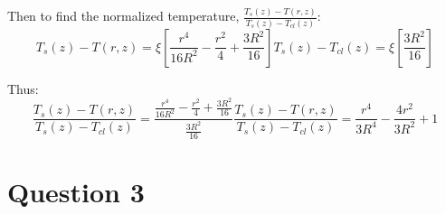 \documentclass{article}
\begin{document}
Then to find the normalized temperature, $\frac{T_s(z) - T(r,z)}{T_s(z) - T_{cl}(z)}$:
\begin{subequations}
    \begin{equation}
        T_s(z) - T(r,z) = \xi\left[ \frac{r^4}{16R^2} - \frac{r^2}{4} + \frac{3R^2}{16} \right]
    \end{equation}
    \begin{equation}
        T_s(z) - T_{cl}(z) = \xi [\frac{3R^2}{16}]
    \end{equation}
\end{subequations}

Thus:
\begin{subequations}

    \begin{equation}
        \frac{T_s(z) - T(r,z)}{T_s(z) - T_{cl}(z)} = \frac{\frac{r^4}{16R^2} - \frac{r^2}{4} + \frac{3R^2}{16}}{\frac{3R^2}{16}}
    \end{equation}
    \begin{equation}
        \frac{T_s(z) - T(r,z)}{T_s(z) - T_{cl}(z)} = \frac{r^4}{3R^4} - \frac{4r^2}{3R^2} + 1 
    \end{equation}
\end{subequations}
\section*{Question 3}
\end{document}
